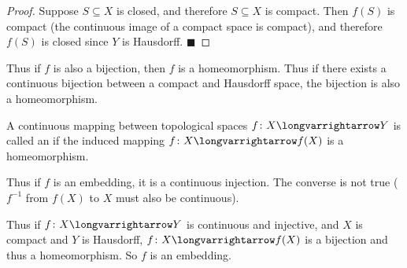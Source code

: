 \documentclass[10pt]{article}
\def\qed{\hskip1cm\penalty-100\hbox{}\hfill$\blacksquare$}
\def\longto{\longvarrightarrow}
\begin{document}
\begin{proof}

    Suppose $S\subseteq X$ is closed, and therefore $S\subseteq X$ is compact.
    Then $f(S)$ is compact (the continuous image of a compact space is compact), and therefore $f(S)$ is closed since $Y$ is Hausdorff.
    \qed

\end{proof}

Thus if $f$ is also a bijection, then $f$ is a homeomorphism.
Thus if there exists a continuous bijection between a compact and Hausdorff space, the bijection is also a homeomorphism.

\begin{defn*}

    A continuous mapping between topological spaces $f\colon X\longto Y$ is called an  if the induced mapping $f\colon X\longto f(X)$ is a homeomorphism.

\end{defn*}

Thus if $f$ is an embedding, it is a continuous injection.
The converse is not true ($f^{-1}$ from $f(X)$ to $X$ must also be continuous).

Thus if $f\colon X\longto Y$ is continuous and injective, and $X$ is compact and $Y$ is Hausdorff, $f\colon X\longto f(X)$ is a bijection and thus a homeomorphism.
So $f$ is an embedding.
\end{document}
